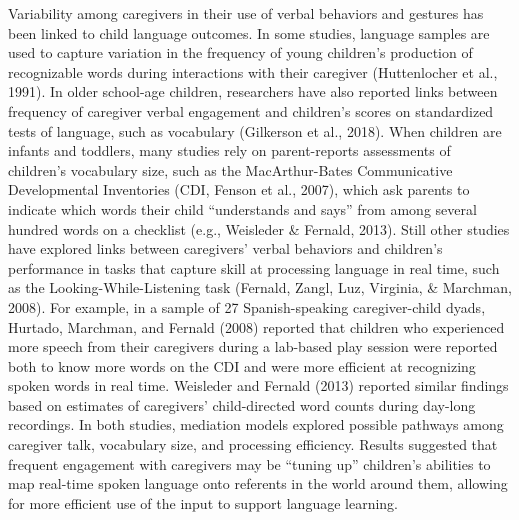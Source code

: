 \documentclass[
  english,
  man,floatsintext]{apa6}
\begin{document}
Variability among caregivers in their use of verbal behaviors and gestures has been linked to child language outcomes. In some studies, language samples are used to capture variation in the frequency of young children's production of recognizable words during interactions with their caregiver (Huttenlocher et al., 1991). In older school-age children, researchers have also reported links between frequency of caregiver verbal engagement and children's scores on standardized tests of language, such as vocabulary (Gilkerson et al., 2018). When children are infants and toddlers, many studies rely on parent-reports assessments of children's vocabulary size, such as the MacArthur-Bates Communicative Developmental Inventories (CDI, Fenson et al., 2007), which ask parents to indicate which words their child \enquote{understands and says} from among several hundred words on a checklist (e.g., Weisleder \& Fernald, 2013). Still other studies have explored links between caregivers' verbal behaviors and children's performance in tasks that capture skill at processing language in real time, such as the Looking-While-Listening task (Fernald, Zangl, Luz, Virginia, \& Marchman, 2008). For example, in a sample of 27 Spanish-speaking caregiver-child dyads, Hurtado, Marchman, and Fernald (2008) reported that children who experienced more speech from their caregivers during a lab-based play session were reported both to know more words on the CDI and were more efficient at recognizing spoken words in real time. Weisleder and Fernald (2013) reported similar findings based on estimates of caregivers' child-directed word counts during day-long recordings. In both studies, mediation models explored possible pathways among caregiver talk, vocabulary size, and processing efficiency. Results suggested that frequent engagement with caregivers may be \enquote{tuning up} children's abilities to map real-time spoken language onto referents in the world around them, allowing for more efficient use of the input to support language learning.
\end{document}
